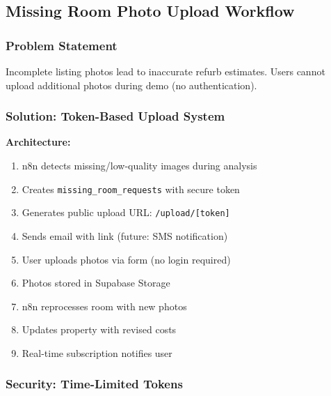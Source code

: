 \documentclass[11pt,a4paper]{article}
\begin{document}
\subsection{Missing Room Photo Upload Workflow}

\subsubsection{Problem Statement}

Incomplete listing photos lead to inaccurate refurb estimates. Users cannot upload additional photos during demo (no authentication).

\subsubsection{Solution: Token-Based Upload System}

\textbf{Architecture:}
\begin{enumerate}
  \item n8n detects missing/low-quality images during analysis
  \item Creates \texttt{missing\_room\_requests} with secure token
  \item Generates public upload URL: \texttt{/upload/[token]}
  \item Sends email with link (future: SMS notification)
  \item User uploads photos via form (no login required)
  \item Photos stored in Supabase Storage
  \item n8n reprocesses room with new photos
  \item Updates property with revised costs
  \item Real-time subscription notifies user
\end{enumerate}

\subsubsection{Security: Time-Limited Tokens}
\end{document}
